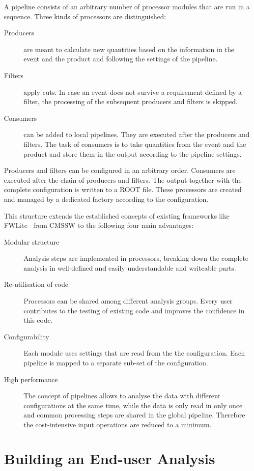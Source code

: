 \documentclass[3p]{elsarticle}
\begin{document}
A pipeline consists of an arbitrary number of processor modules that are run in a sequence. Three kinds of processors are distinguished:
\begin{description}
\item[Producers] are meant to calculate new quantities based on the information in the event and the product and following the settings of the pipeline.
\item[Filters] apply cuts. In case an event does not survive a requirement defined by a filter, the processing of the subsequent producers and filters is skipped.
\item[Consumers] can be added to local pipelines. They are executed after the producers and filters. The task of consumers is to take quantities from the event and the product and store them in the output according to the pipeline settings.
\end{description}
Producers and filters can be configured in an arbitrary order. Consumers are executed after the chain of producers and filters. The output together with the complete configuration is written to a ROOT file. These processors are created and managed by a dedicated factory according to the configuration.

This structure extends the established concepts of existing frameworks like FWLite~\cite{FWLite} from CMSSW to the following four main advantages:
\begin{description}
\item[Modular structure] Analysis steps are implemented in processors, breaking down the complete analysis in well-defined and easily understandable and writeable parts.
\item[Re-utilisation of code] Processors can be shared among different analysis groups. Every user contributes to the testing of existing code and improves the confidence in this code.
\item[Configurability] Each module uses settings that are read from the the configuration. Each pipeline is mapped to a separate sub-set of the configuration.
\item[High performance] The concept of pipelines allows to analyse the data with different configurations at the same time, while the data is only read in only once and common processing steps are shared in the global pipeline. Therefore the cost-intensive input operations are reduced to a minimum.
\end{description}


\section{Building an End-user Analysis \label{section_artus_analysis}}
\end{document}
